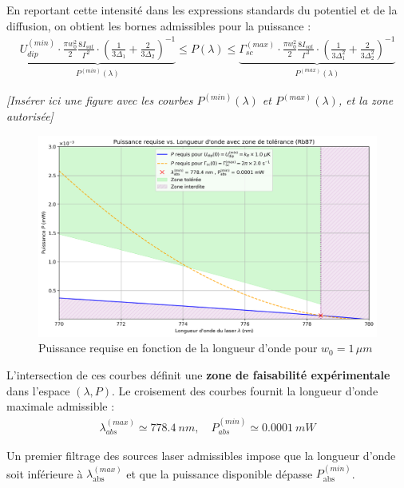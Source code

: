 En reportant cette intensité dans les expressions standards du potentiel et de la diffusion, on obtient les bornes admissibles pour la puissance :
\begin{eqnarray}
	 \underbrace{U_{dip}^{(min)} \cdot  \frac{\pi w_0^2}{2} \frac{8 I_{sat}}{\Gamma^2} \cdot \left( \frac{ 1}{ 3 \Delta_1} + \frac{2 }{ 3 \Delta_2}  \right )^{-1} }_{P^{(min)}(\lambda)}  \leq P(\lambda) \leq \underbrace{ \Gamma_{sc}^{(max)} \cdot \frac{\pi w_0^2}{2} \frac{8 I_{sat}}{\Gamma^3} \cdot \left( \frac{ 1}{ 3 \Delta_1^2} + \frac{2 }{ 3 \Delta_2^2}  \right )^{-1}}_{ P^{(max)}(\lambda)} 
\end{eqnarray}

\begin{center}
\textit{[Insérer ici une figure avec les courbes $P^{(min)}(\lambda)$ et $P^{(max)}(\lambda)$, et la zone autorisée]}
\end{center}

\begin{figure}[H]
    \centering
    \includegraphics[width=0.7\linewidth]{figures/07_Dipolaire/puissance_vs_lambda_log.png}
    \caption{Puissance requise en fonction de la longueur d'onde pour $w_0 = 1 \, \mu m$ }
\end{figure}

L’intersection de ces courbes définit une {\bf zone de faisabilité expérimentale} dans l’espace $(\lambda, P)$. Le croisement des courbes fournit la longueur d’onde maximale admissible :
\begin{eqnarray*}
	\lambda^{(max)}_{abs} \simeq 778.4~nm , \quad P^{(min)}_{abs} \simeq 0.0001 ~ mW
\end{eqnarray*}

Un premier filtrage des sources laser admissibles impose que la longueur d’onde soit inférieure à $\lambda^{(max)}_{\text{abs}}$ et que la puissance disponible dépasse $P^{(min)}_{\text{abs}}$.

%

